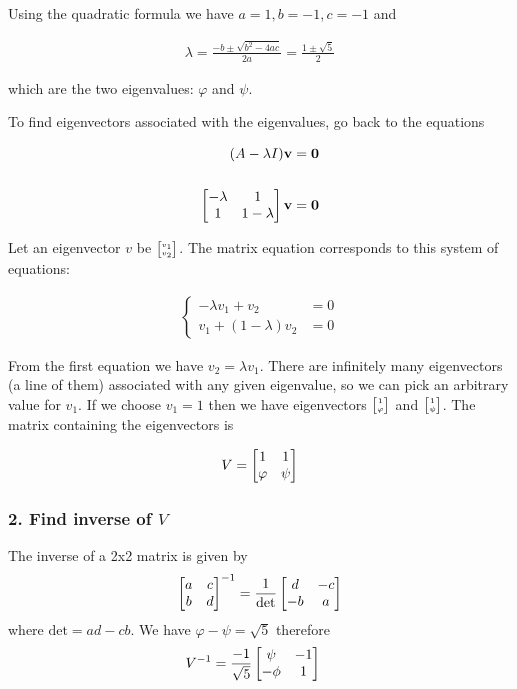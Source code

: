 Using the quadratic formula we have $a=1, b=-1, c=-1$ and

\begin{align*}
\lambda
= \frac{-b \pm \sqrt{b^2 - 4ac}}{2a}
= \frac{1 \pm \sqrt{5}}{2}
\end{align*}

which are the two eigenvalues: $\varphi$ and $\psi$.

To find eigenvectors associated with the eigenvalues, go back to the equations

\begin{align*}
(A - \lambda I)\mathbf v &= \mathbf 0
\\
\\
\begin{bmatrix}-\lambda & 1\\1        & 1 - \lambda\\ \end{bmatrix} \mathbf v &= \mathbf 0
\end{align*}

Let an eigenvector $v$ be $\tiny{\begin{bmatrix}v_1\\v_2\end{bmatrix}}$. The matrix equation corresponds
to this system of equations:

\begin{align*}
\begin{cases}
-\lambda v_1 + v_2               &= 0\\
v_1          + (1 - \lambda) v_2 &= 0
\end{cases}
\end{align*}

From the first equation we have $v_2 = \lambda v_1$. There are infinitely many
eigenvectors (a line of them) associated with any given eigenvalue, so we can
pick an arbitrary value for $v_1$. If we choose $v_1 = 1$ then we have
eigenvectors $\tiny{\begin{bmatrix}1\\\varphi\end{bmatrix}}$ and $\tiny{\begin{bmatrix}1\\\psi\end{bmatrix}}$. The matrix
containing the eigenvectors is

\begin{align*}
V = \begin{bmatrix}1 & 1\\\varphi & \psi\\ \end{bmatrix}
\end{align*}

\subsubsection{2. Find inverse of $V$}


The inverse of a 2x2 matrix is given by
\begin{align*}
\begin{bmatrix}a & c\\b & d\\ \end{bmatrix} ^ {-1}
=
\frac{1}{\text{det}} \begin{bmatrix}d & -c\\-b & a\\ \end{bmatrix}
\end{align*}
where $\text{det} = ad - cb$. We have $\varphi - \psi = \sqrt5$ therefore
\begin{align*}
V^{-1}
&= \frac{-1}{\sqrt5} \begin{bmatrix}\psi & -1\\-\phi & 1\\ \end{bmatrix}
\end{align*}


